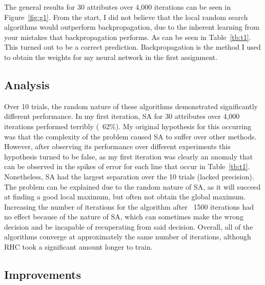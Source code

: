 \documentclass[annual]{acmsiggraph}
\begin{document}
The general results for 30 attributes over 4,000 iterations can be seen in Figure~\ref{fig:g1}. From the start, I did not
believe that the local random search algorithms would outperform backpropagation, due to the inherent learning from
your mistakes that backpropagation performs. As can be seen in Table~\ref{tb:t1}. This turned out to be a correct
prediction. Backpropagation is the method I used to obtain the weights for my neural network in the first assignment.
\subsection{Analysis}
Over 10 trials, the random nature of these algorithms demonstrated significantly different performance. In my
first iteration, SA for 30 attributes over 4,000 iterations performed terribly (~62\%). My original hypothesis for this
occurring was that the complexity of the problem caused SA to suffer over other methods. However, after observing its
performance over different experiments this hypothesis turned to be false, as my first iteration was clearly an anomaly
that can be observed in the spikes of error for each line that occur in Table~\ref{tb:t1}. Nonetheless, SA had the largest
separation over the 10 trials (lacked precision). The problem can be explained due to the random nature of SA, as it
will succeed at finding a good local maximum, but often not obtain the global maximum. Increasing the number of iterations
for the algorithm after ~1500 iterations had no effect because of the nature of SA, which can sometimes make the wrong 
decision and be incapable of recuperating from said decision. Overall, all of the algorithms converge at approximately
the same number of iterations, although RHC took a significant amount longer to train.
\subsection{Improvements}
\end{document}
